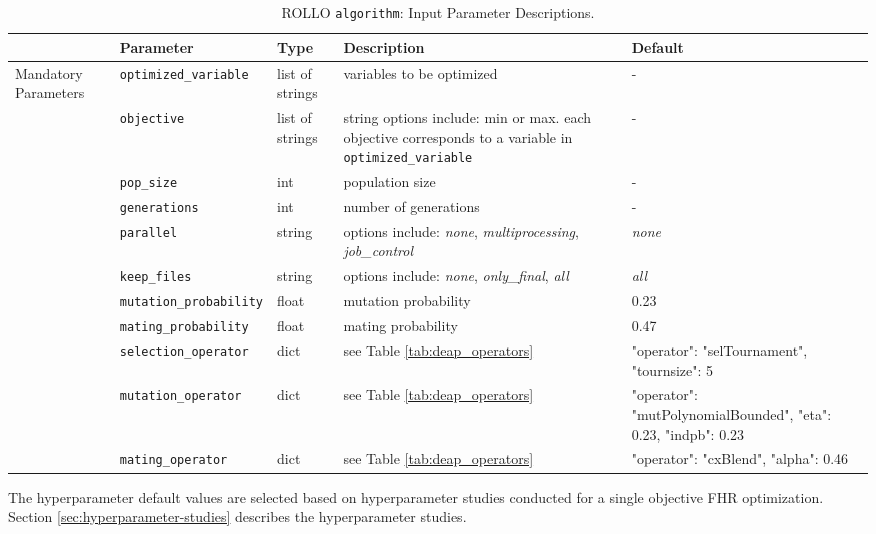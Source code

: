 \begin{table}[htbp]
    \centering
    \onehalfspacing
    \caption{\acrfull{ROLLO} \texttt{algorithm}: Input Parameter Descriptions.}
	\label{tab:algorithm-inputs}
    \scriptsize
    \begin{tabular}{l|lp{1.7cm}p{3.5cm}p{3.5cm}}
    \hline
    & \textbf{Parameter} & \textbf{Type} & \textbf{Description} & \textbf{Default} \\
    \hline
    \multirow{9}{1.8cm}{Mandatory Parameters} 
    & \texttt{optimized\_variable} & list of strings & variables to be optimized & -\\
    \cline{2-5}
    & \texttt{objective} & list of strings & string options include: min or max.
    each objective corresponds to a variable in \texttt{optimized\_variable} & -\\
    \cline{2-5}
    & \texttt{pop\_size} & int & population size & -\\
    \cline{2-5}
    & \texttt{generations} & int & number of generations & -\\
    \hline
    \multirow{15}{1.8cm}{Optional Parameters} 
    & \texttt{parallel} & string & options include: \textit{none}, \textit{multiprocessing}, \textit{job\_control} & \textit{none} \\
    \cline{2-5}
    & \texttt{keep\_files} & string & options include: \textit{none}, \textit{only\_final}, \textit{all} & \textit{all} \\
    \cline{2-5}
    & \texttt{mutation\_probability} & float & mutation probability & 0.23 \\
    \cline{2-5}
    & \texttt{mating\_probability} & float & mating probability & 0.47 \\
    \cline{2-5}
    & \texttt{selection\_operator} & dict & see Table \ref{tab:deap_operators} & \scriptsize{{"operator": "selTournament", "tournsize": 5}}\\
    \cline{2-5}
    & \texttt{mutation\_operator} & dict & see Table \ref{tab:deap_operators} & \scriptsize{{"operator": "mutPolynomialBounded", "eta": 0.23, "indpb": 0.23}}\\
    \cline{2-5}
    & \texttt{mating\_operator} & dict & see Table \ref{tab:deap_operators} & \scriptsize{{"operator": "cxBlend", "alpha": 0.46}}\\
    \hline 
    \end{tabular}
    \end{table}
The hyperparameter default values are selected based on hyperparameter studies conducted 
for a single objective \gls{FHR} optimization. 
Section \ref{sec:hyperparameter-studies} describes the hyperparameter studies. 

